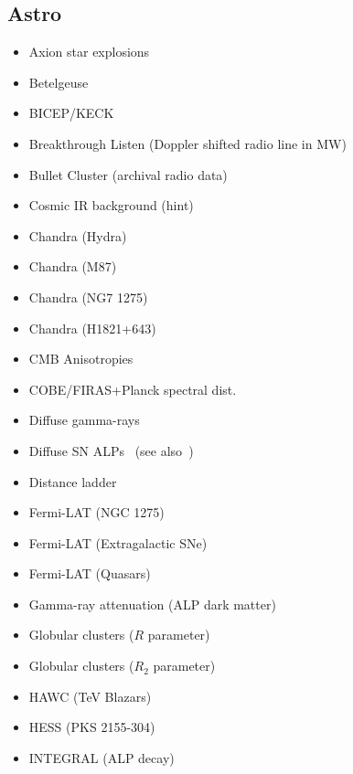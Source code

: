 \documentclass[8pt,twocolumn]{extarticle}
\begin{document}
\begin{mdframed}[everyline=true]
\subsection*{Astro}\vspace{-0.5em}
\begin{itemize}\setlength\itemsep{-0.5em}
	\item Axion star explosions~\cite{Escudero:2023vgv}
	\item Betelgeuse~\cite{Xiao:2020pra}
	\item BICEP/KECK~\cite{BICEPKeck:2021sbt}
	\item Breakthrough Listen (Doppler shifted radio line in MW)~\cite{Keller:2021zbl}
    \item Bullet Cluster (archival radio data)~\cite{Chan:2021gjl}
  	\item Cosmic IR background (hint)~\cite{Kohri:2017ljt}
    \item Chandra (Hydra)~\cite{Wouters:2013hua}
    \item Chandra (M87)~\cite{Marsh:2017yvc}
    \item Chandra (NG7 1275)~\cite{Reynolds:2019uqt}
    \item Chandra (H1821+643)~\cite{Reynes:2021bpe}
    \item CMB Anisotropies~\cite{Capozzi:2023xie,Liu:2023nct}
    \item COBE/FIRAS+Planck spectral dist.~\cite{Bolliet:2020ofj}
    \item Diffuse gamma-rays~\cite{Caputo:2022mah}
    \item Diffuse SN ALPs~\cite{Calore:2021hhn} (see also~\cite{Calore:2020tjw})
    \item Distance ladder~\cite{Buen-Abad:2020zbd}
    \item Fermi-LAT (NGC 1275)~\cite{Fermi-LAT:2016nkz}
    \item Fermi-LAT (Extragalactic SNe)~\cite{Meyer:2020vzy}
   	\item Fermi-LAT (Quasars)~\cite{Davies:2022wvj}
   	\item Gamma-ray attenuation (ALP dark matter)~\cite{Bernal:2022xyi}
    \item Globular clusters ($R$ parameter)~\cite{Ayala:2014pea}
    \item Globular clusters ($R_2$ parameter)~\cite{Dolan:2022kul}
    \item HAWC (TeV Blazars)~\cite{Jacobsen:2022swa}
    \item HESS (PKS 2155-304)~\cite{HESS:2013udx}
    \item INTEGRAL (ALP decay)~\cite{Calore:2022pks}

\end{itemize}
\end{mdframed}
\end{document}

